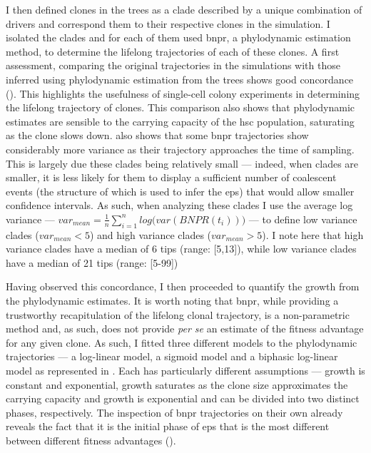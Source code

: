 I then defined clones in the trees as a clade described by a unique combination of drivers and correspond them to their respective clones in the simulation. I isolated the clades and for each of them used \ac{bnpr}, a phylodynamic estimation method, to determine the lifelong trajectories of each of these clones. A first assessment, comparing the original trajectories in the simulations with those inferred using phylodynamic estimation from the trees shows good concordance (). This highlights the usefulness of single-cell colony experiments in determining the lifelong trajectory of clones. This comparison also shows that phylodynamic estimates are sensible to the carrying capacity of the \ac{hsc} population, saturating as the clone slows down.  also shows that some \ac{bnpr} trajectories show considerably more variance as their trajectory approaches the time of sampling. This is largely due these clades being relatively small --- indeed, when clades are smaller, it is less likely for them to display a sufficient number of coalescent events (the structure of which is used to infer the \ac{eps}) that would allow smaller confidence intervals. As such, when analyzing these clades I use the average log variance --- $var_{mean} = \frac{1}{n}\sum_{i=1}^{n}{log(var(BNPR(t_i))})$ --- to define low variance clades ($var_{mean} < 5$) and high variance clades ($var_{mean}>5$). I note here that high variance clades have a median of 6 tips (range: [5,13]), while low variance clades have a median of 21 tips (range: [5-99])

\begin{figure}[h]
	\label{fig:wf-vs-bnpr-traj}
\end{figure}

Having observed this concordance, I then proceeded to quantify the growth from the phylodynamic estimates. It is worth noting that \ac{bnpr}, while providing a trustworthy recapitulation of the lifelong clonal trajectory, is a non-parametric method and, as such, does not provide \textit{per se} an estimate of the fitness advantage for any given clone. As such, I fitted three different models to the phylodynamic trajectories --- a log-linear model, a sigmoid model and a biphasic log-linear model as represented in . Each has particularly different assumptions --- growth is constant and exponential, growth saturates as the clone size approximates the carrying capacity and growth is exponential and can be divided into two distinct phases, respectively. The inspection of \ac{bnpr} trajectories on their own already reveals the fact that it is the initial phase of \ac{eps} that is the most different between different fitness advantages ().

